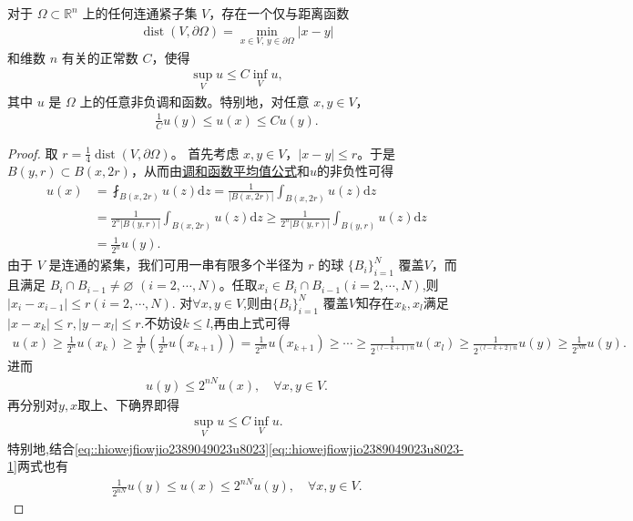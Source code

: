 \documentclass[../../main.tex]{subfiles}%
\begin{document}
\begin{theorem}[Harnack不等式]\label{theorem:Harnack不等式}
对于 $\Omega\subset \mathbb{R}^n$ 上的任何连通紧子集 $V$，存在一个仅与距离函数
\begin{align*}
\operatorname{dist}(V,\partial\Omega) = \min_{x\in V,\, y\in\partial\Omega} |x-y|
\end{align*}
和维数 $n$ 有关的正常数 $C$，使得
\begin{align*}
\sup_V u \leqslant C \inf_V u,
\end{align*}
其中 $u$ 是 $\Omega$ 上的任意非负调和函数。特别地，对任意 $x,y\in V$，
\begin{align*}
\frac{1}{C}u(y) \leqslant u(x) \leqslant C u(y).
\end{align*}
\end{theorem}
\begin{proof}
取 $r = \frac{1}{4}\operatorname{dist}(V,\partial\Omega)$。
首先考虑 $x,y\in V$，$|x-y|\leqslant r$。于是 $B(y,r)\subset B(x,2r)$，从而由\hyperref[theorem:调和函数平均值公式]{调和函数平均值公式}和$u$的非负性可得
\begin{align*}
u(x)&=\fint_{B\left( x,2r \right)}{u\left( z \right) \mathrm{d}z}=\frac{1}{\left| B\left( x,2r \right) \right|}\int_{B\left( x,2r \right)}{u\left( z \right) \mathrm{d}z}
\\
&=\frac{1}{2^n\left| B\left( y,r \right) \right|}\int_{B\left( x,2r \right)}{u\left( z \right) \mathrm{d}z}\geqslant \frac{1}{2^n\left| B\left( y,r \right) \right|}\int_{B\left( y,r \right)}{u\left( z \right) \mathrm{d}z}
\\
&= \frac{1}{2^n}u\left( y \right) .
\end{align*}
由于 $V$ 是连通的紧集，我们可用一串有限多个半径为 $r$ 的球 $\{B_i\}_{i=1}^N$ 覆盖$V$，而且满足 $B_i\cap B_{i-1}\neq\varnothing$ $(i=2,\cdots,N)$。任取$x_i\in B_i\cap B_{i-1}(i=2,\cdots,N)$,则$|x_i-x_{i-1}|\leqslant r(i=2,\cdots,N)$.
对$\forall x,y\in V$,则由$\{B_i\}_{i=1}^N$ 覆盖$V$知存在$x_k,x_l$满足$|x-x_k|\leqslant r,|y-x_l|\leqslant r$.不妨设$k\leqslant l$,再由上式可得
\begin{align}
u\left( x \right) \geqslant \frac{1}{2^n}u\left( x_k \right) \geqslant \frac{1}{2^n}\left( \frac{1}{2^n}u\left( x_{k+1} \right) \right) =\frac{1}{2^{2n}}u\left( x_{k+1} \right) \geqslant \cdots \geqslant \frac{1}{2^{\left( l-k+1 \right) n}}u\left( x_l \right) \geqslant \frac{1}{2^{\left( l-k+2 \right) n}}u\left( y \right) \geqslant \frac{1}{2^{Nn}}u\left( y \right) .\label{eq::hiowejfiowjio2389049023u8023}
\end{align}
进而
\begin{align}
u(y)\leqslant 2^{nN}u(x),\quad \forall x,y\in V.\label{eq::hiowejfiowjio2389049023u8023-1}
\end{align}
再分别对$y,x$取上、下确界即得
\begin{align*}
\sup_V u \leqslant C \inf_V u.
\end{align*}
特别地,结合\eqref{eq::hiowejfiowjio2389049023u8023}\eqref{eq::hiowejfiowjio2389049023u8023-1}两式也有
\begin{align*}
\frac{1}{2^{nN}}u(y)\leqslant u(x)\leqslant 2^{nN}u(y),\quad \forall x,y\in V.
\end{align*}
\end{proof}
\end{document}
